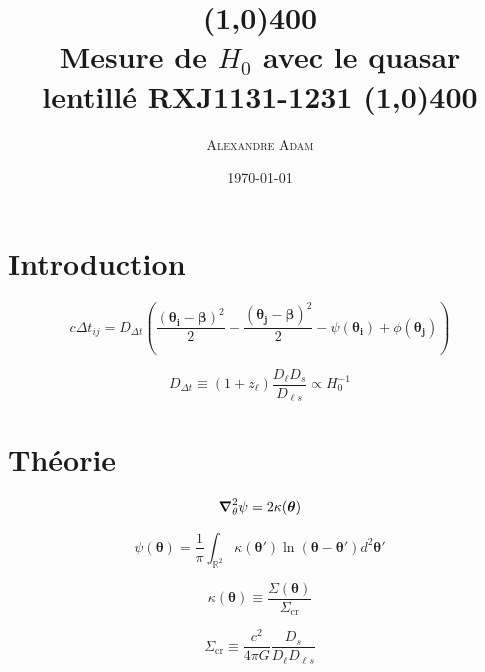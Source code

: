 \documentclass[times,10pt,twocolumn]{article}
\title{\vspace{-10mm}
\line(1,0){400}\\
Mesure de $H_0$ avec le quasar lentillé \textsc{RXJ1131-1231}
\line(1,0){400}
\vspace{-4mm}
}
\author{\large \textsc{Alexandre Adam}}
\affiliation{\vspace{2mm} PHY6669 -- Cosmologie\\
Département de physique \\ Université de Montréal
}
\date{\today}
\begin{document}
\twocolumn[
\maketitle
\begin{onecolabstract} %
\vspace{4mm} %
\end{onecolabstract}
]

\section{Introduction}\label{sec:intro}
\begin{equation}\label{eq:TimeDelay} 
        c\Delta t_{ij} = D_{\Delta t} \left( \frac{(\boldsymbol{\theta_i} - \boldsymbol{\beta})^2}{2} - 
                \frac{(\boldsymbol{\theta_j} - \boldsymbol{\beta})^{2}}{2}
        - \psi(\boldsymbol{\theta_i}) + \phi(\boldsymbol{\theta_j})\right)
\end{equation} 

\begin{equation}\label{eq:Ddt} 
        D_{\Delta t} \equiv (1 + z_{\ell}) \frac{D_\ell D_s}{D_{\ell s}} \propto H_0^{-1}
\end{equation} 
\section{Théorie}\label{sec:theorie}

\begin{equation}\label{eq:Poisson} 
        \grad^{2}_{\theta} \psi = 2 \kappa(\boldsymbol{\theta} )
\end{equation} 

\begin{equation}\label{eq:Potentiel} 
        \psi(\boldsymbol{ \theta}) = \frac{1}{\pi} \int_{\mathbb{R}^2} 
        \kappa(\boldsymbol{ \theta}') \ln(\boldsymbol{\theta} - \boldsymbol{\theta}') d^2\boldsymbol{\theta}'
\end{equation} 

\begin{equation}\label{eq:Convergence} 
        \kappa(\boldsymbol{\theta}) \equiv \frac{\Sigma(\boldsymbol{\theta})}{\Sigma_{\mathrm{cr}}}
\end{equation} 

\begin{equation}\label{eq:Sigcritique} 
        \Sigma_{\mathrm{cr}} \equiv \frac{c^2}{4\pi G} \frac{D_s}{D_\ell D_{\ell s}}
\end{equation} 
\end{document}
